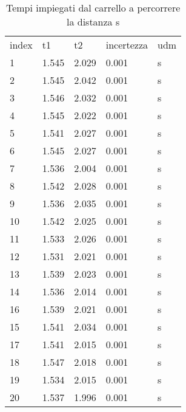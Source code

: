\begin{table}[]
\caption{Tempi impiegati dal carrello a percorrere la distanza s}
\label{tab:tempi}
\begin{tabular}{lllll}
index & t1    & t2    & incertezza & udm \\
1     & 1.545 & 2.029 & 0.001      & s   \\
2     & 1.545 & 2.042 & 0.001      & s   \\
3     & 1.546 & 2.032 & 0.001      & s   \\
4     & 1.545 & 2.022 & 0.001      & s   \\
5     & 1.541 & 2.027 & 0.001      & s   \\
6     & 1.545 & 2.027 & 0.001      & s   \\
7     & 1.536 & 2.004 & 0.001      & s   \\
8     & 1.542 & 2.028 & 0.001      & s   \\
9     & 1.536 & 2.035 & 0.001      & s   \\
10    & 1.542 & 2.025 & 0.001      & s   \\
11    & 1.533 & 2.026 & 0.001      & s   \\
12    & 1.531 & 2.021 & 0.001      & s   \\
13    & 1.539 & 2.023 & 0.001      & s   \\
14    & 1.536 & 2.014 & 0.001      & s   \\
16    & 1.539 & 2.021 & 0.001      & s   \\
15    & 1.541 & 2.034 & 0.001      & s   \\
17    & 1.541 & 2.015 & 0.001      & s   \\
18    & 1.547 & 2.018 & 0.001      & s   \\
19    & 1.534 & 2.015 & 0.001      & s   \\
20    & 1.537 & 1.996 & 0.001      & s  
\end{tabular}
\end{table}